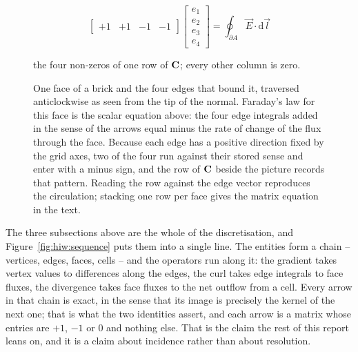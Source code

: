 \begin{figure}[htbp]
\centering
\begin{minipage}[c]{0.50\linewidth}
\centering
{}
\end{minipage}\hfill
\begin{minipage}[c]{0.46\linewidth}
\centering
{\small
\[
\begin{bmatrix} +1 & +1 & -1 & -1 \end{bmatrix}
\begin{bmatrix} e_1 \\ e_2 \\ e_3 \\ e_4 \end{bmatrix}
= \oint_{\partial A} \vec E \cdot \mathrm{d}\vec l
\]}
{\footnotesize the four non-zeros of one row of $\mathbf{C}$; every other column is zero.\par}
\end{minipage}
\caption{One face of a brick and the four edges that bound it, traversed anticlockwise as seen from the tip of
the normal. Faraday's law for this face is the scalar equation above: the four edge integrals added in the sense
of the arrows equal minus the rate of change of the flux through the face. Because each edge has a positive
direction fixed by the grid axes, two of the four run against their stored sense and enter with a minus sign,
and the row of $\mathbf{C}$ beside the picture records that pattern. Reading the row against the edge vector
reproduces the circulation; stacking one row per face gives the matrix equation in the text.}
\label{fig:hiw:faraday}
\end{figure}

The three subsections above are the whole of the discretisation, and Figure~\ref{fig:hiw:sequence} puts them
into a single line. The entities form a chain -- vertices, edges, faces, cells -- and the operators run along it:
the gradient takes vertex values to differences along the edges, the curl takes edge integrals to face fluxes,
the divergence takes face fluxes to the net outflow from a cell. Every arrow in that chain is exact, in the sense
that its image is precisely the kernel of the next one; that is what the two identities assert, and each arrow is
a matrix whose entries are $+1$, $-1$ or $0$ and nothing else. That is the claim the rest of this report leans
on, and it is a claim about incidence rather than about resolution.

